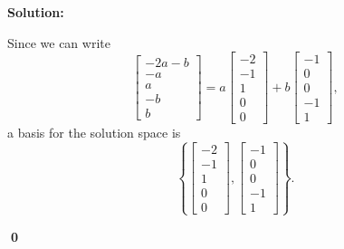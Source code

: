 \documentclass{article}
\newenvironment{solution}
{
  \ignorespaces
  \textbf{Solution:}
}
{
  \ignorespacesafterend
  \begin{flushright}
  {\bfseries \qed}
  \end{flushright}
}
\begin{document}
\begin{solution}
Since we can write \[\begin{bmatrix} -2a-b \\ -a \\ a \\ -b \\ b \end{bmatrix} = a \begin{bmatrix} -2 \\ -1 \\ 1 \\ 0 \\ 0 \end{bmatrix} + b \begin{bmatrix} -1 \\ 0 \\ 0 \\ -1 \\ 1 \end{bmatrix}, \]
a basis for the solution space is
\[ \left \{ \begin{bmatrix} -2 \\ -1 \\ 1 \\ 0 \\ 0 \end{bmatrix} , \begin{bmatrix} -1 \\ 0 \\ 0 \\ -1 \\ 1 \end{bmatrix} \right\}.\]
\end{solution}
\end{document}
